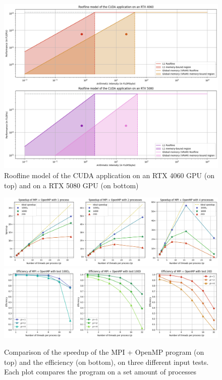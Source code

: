 \documentclass[11pt, journal]{IEEEtran}
\begin{document}
\begin{figure}
    \label{cuda_roofline}
    \includegraphics[width=\linewidth]{imgs/roofline.png}
    \caption{Roofline model of the CUDA application on an RTX 4060 GPU (on top) and on a RTX 5080 GPU (on bottom)}
\end{figure}

\begin{figure}
    \label{stats_mpi_omp}
    \centering
    \includegraphics[width=\linewidth]{imgs/mpi_omp_speedup.png}
    \includegraphics[width=\linewidth]{imgs/mpi_omp_efficiency.png}

    \caption{Comparison of the speedup of the MPI + OpenMP program (on top) and the efficiency (on bottom), on three different input tests. Each plot compares the program on a set amount of processes}
\end{figure}
\end{document}

